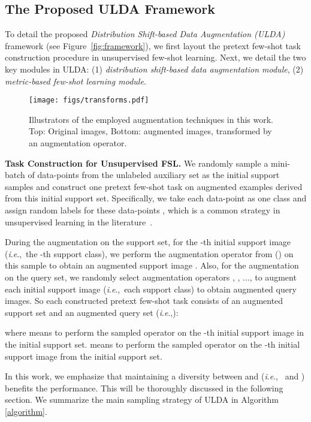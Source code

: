 \documentclass[letterpaper]{article} \usepackage{aaai21}  \usepackage{times}  \usepackage{helvet} \usepackage{courier}  \usepackage[hyphens]{url}  \usepackage{graphicx} \urlstyle{rm} \def\UrlFont{\rm}  \usepackage{natbib}  \usepackage{caption} \usepackage{url}
\newcommand{\ie}{\textit{i}.\textit{e}.,}
\begin{document}
\label{method:ULDA}
\subsection{The Proposed ULDA Framework}
To detail the proposed \textit{Distribution Shift-based Data Augmentation (ULDA)} framework (see Figure~\ref{fig:framework}), we first layout the pretext few-shot task construction procedure in unsupervised few-shot learning. Next, we detail the two key modules in ULDA: (1) \emph{distribution shift-based data augmentation module}, (2) \emph{metric-based few-shot learning module}. 

\begin{figure*}[!tbp]
\vspace{-0.3cm}
\centering
\texttt{[image: figs/transforms.pdf]}
\vspace{-0.2cm}
\caption{Illustrators of the employed augmentation techniques in this work. Top: Original images, Bottom: augmented images, transformed by an augmentation operator.}
\label{fig:transforms}
\vspace{-0.2cm}
\end{figure*}
 
\noindent\textbf{Task Construction for Unsupervised FSL.}
We randomly sample a mini-batch of  data-points  from the unlabeled auxiliary set  as the initial support samples and construct one pretext few-shot task on augmented examples derived from this initial support set. Specifically, we take each data-point as one class and assign random labels for these data-points , which is a common strategy in unsupervised learning in the literature~\cite{Wu2018CVPR,He2019MoCo}.

During the augmentation on the support set, for the -th initial support image  (\ie~the -th support class), we perform the augmentation operator  from  () on this sample to obtain an augmented support image . Also, for the augmentation on the query set, we randomly select  augmentation operators , , ...,  to augment each initial support image (\ie~each support class) to obtain  augmented query images. So each constructed pretext few-shot task  consists of an augmented support set  and an augmented query set  (\ie ):

where  means to perform the sampled operator  on the -th initial support image  in the initial support set.  means to perform the sampled operator  on the -th initial support image  from the initial support set.

In this work, we emphasize that maintaining a diversity between  and  (\ie~ and ) benefits the performance. This will be thoroughly discussed in the following section. We summarize the main sampling strategy of ULDA in Algorithm \ref{algorithm}.
\end{document}
